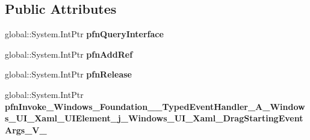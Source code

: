 \subsection*{Public Attributes}
\begin{DoxyCompactItemize}
\item 
\mbox{\label{struct_windows_1_1_foundation_1_1_typed_event_handler___a___windows___u_i___xaml___u_i_element__45e7e61598f8bb4613234898c88fca41_ad36c9b6be96119502c46ea7dc1fe085e}} 
global\+::\+System.\+Int\+Ptr {\bfseries pfn\+Query\+Interface}
\item 
\mbox{\label{struct_windows_1_1_foundation_1_1_typed_event_handler___a___windows___u_i___xaml___u_i_element__45e7e61598f8bb4613234898c88fca41_ada40085f06c14af28b162021e008f4db}} 
global\+::\+System.\+Int\+Ptr {\bfseries pfn\+Add\+Ref}
\item 
\mbox{\label{struct_windows_1_1_foundation_1_1_typed_event_handler___a___windows___u_i___xaml___u_i_element__45e7e61598f8bb4613234898c88fca41_ad0fb0fd9c98b3f19fbbd71ce577f7a29}} 
global\+::\+System.\+Int\+Ptr {\bfseries pfn\+Release}
\item 
\mbox{\label{struct_windows_1_1_foundation_1_1_typed_event_handler___a___windows___u_i___xaml___u_i_element__45e7e61598f8bb4613234898c88fca41_a7bcead0301d93f9b816fecff7346e837}} 
global\+::\+System.\+Int\+Ptr {\bfseries pfn\+Invoke\+\_\+\+Windows\+\_\+\+Foundation\+\_\+\+\_\+\+Typed\+Event\+Handler\+\_\+\+A\+\_\+\+Windows\+\_\+\+U\+I\+\_\+\+Xaml\+\_\+\+U\+I\+Element\+\_\+j\+\_\+\+Windows\+\_\+\+U\+I\+\_\+\+Xaml\+\_\+\+Drag\+Starting\+Event\+Args\+\_\+\+V\+\_\+}
\end{DoxyCompactItemize}

